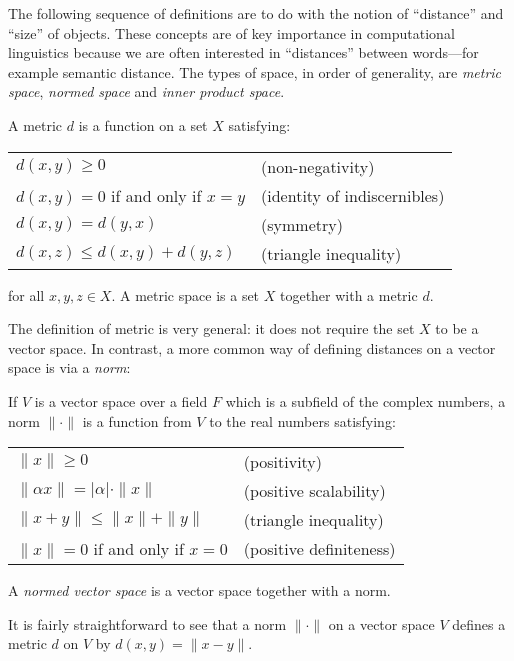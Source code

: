 \documentclass[12pt]{report}
\begin{document}
The following sequence of definitions are to do with the notion of ``distance'' and ``size'' of objects. These concepts are of key importance in computational linguistics because we are often interested in ``distances'' between words---for example semantic distance. The types of space, in order of generality, are \emph{metric space}, \emph{normed space} and \emph{inner product space}.
\begin{defn}[Metric]
A metric $d$ is a function on a set $X$ satisfying:
\begin{center}
\begin{tabular}{ll}
$d(x,y) \ge 0$ & (non-negativity)\\
$d(x,y) = 0$ if and only if $x=y$ & (identity of indiscernibles)\\
$d(x,y) = d(y,x)$ & (symmetry)\\
$d(x,z) \le d(x,y) + d(y,z)$ & (triangle inequality)
\end{tabular}
\end{center}
for all $x,y,z \in X$. A metric space is a set $X$ together with a metric $d$.
\end{defn}

The definition of metric is very general: it does not require the set $X$ to be a vector space. In contrast, a more common way of defining distances on a vector space is via a \emph{norm}:
\begin{defn}[Norm]
If $V$ is a vector space over a field $F$ which is a subfield of the complex numbers, a norm $\|\cdot\|$ is a function from $V$ to the real numbers satisfying:
\begin{center}
\begin{tabular}{ll}
$\|x\| \ge 0$ & (positivity)\\
$\|\alpha x\| = |\alpha|\cdot\|x\|$ & (positive scalability)\\
$\|x + y\| \le \|x\| + \|y\|$ & (triangle inequality)\\
$\|x\| = 0$ if and only if $x = 0$ & (positive definiteness)
\end{tabular}
\end{center}
A \emph{normed vector space} is a vector space together with a norm.
\end{defn}
It is fairly straightforward to see that a norm $\|\cdot\|$ on a vector space $V$ defines a metric $d$ on $V$ by $d(x,y) = \|x - y\|$.
\end{document}
